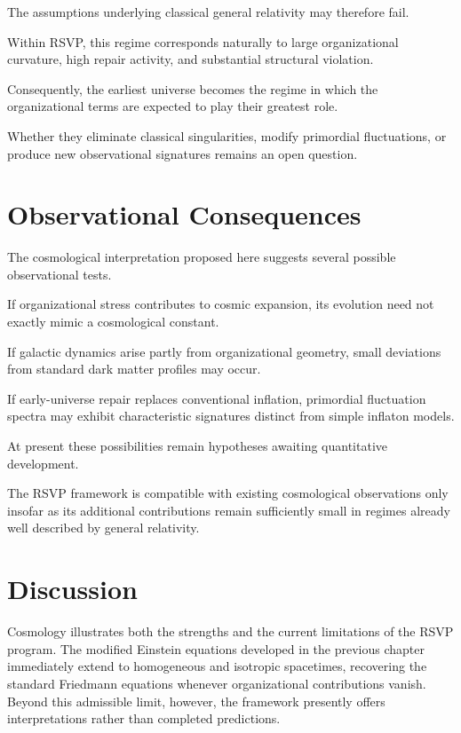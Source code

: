 \documentclass[11pt,oneside]{book}
\numberwithin{equation}{chapter}
\theoremstyle{definition}
\theoremstyle{plain}
\begin{document}
The assumptions underlying classical general relativity may therefore fail.

Within RSVP, this regime corresponds naturally to large organizational
curvature, high repair activity, and substantial structural violation.

Consequently, the earliest universe becomes the regime in which the
organizational terms are expected to play their greatest role.

Whether they eliminate classical singularities, modify primordial
fluctuations, or produce new observational signatures remains an open
question.

\section{Observational Consequences}

The cosmological interpretation proposed here suggests several possible
observational tests.

If organizational stress contributes to cosmic expansion, its evolution need
not exactly mimic a cosmological constant.

If galactic dynamics arise partly from organizational geometry, small
deviations from standard dark matter profiles may occur.

If early-universe repair replaces conventional inflation, primordial
fluctuation spectra may exhibit characteristic signatures distinct from
simple inflaton models.

At present these possibilities remain hypotheses awaiting quantitative
development.

The RSVP framework is compatible with existing cosmological observations
only insofar as its additional contributions remain sufficiently small in
regimes already well described by general relativity.

\section{Discussion}

Cosmology illustrates both the strengths and the current limitations of the
RSVP program. The modified Einstein equations developed in the previous
chapter immediately extend to homogeneous and isotropic spacetimes,
recovering the standard Friedmann equations whenever organizational
contributions vanish. Beyond this admissible limit, however, the framework
presently offers interpretations rather than completed predictions.
\end{document}
